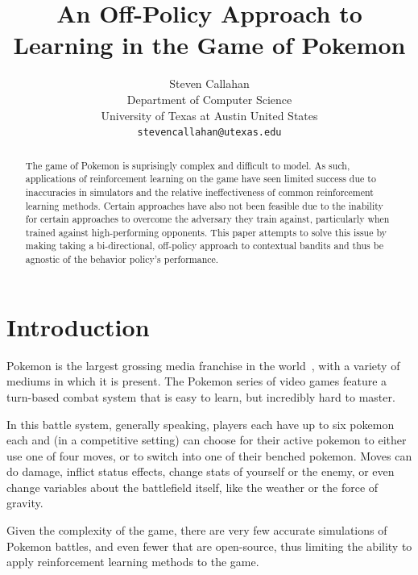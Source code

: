 \documentclass{article}
\title{An Off-Policy Approach to Learning in the Game of Pokemon}
\author{
  Steven Callahan\\
  Department of Computer Science\\
  University of Texas at Austin
  United States\\
  \texttt{stevencallahan@utexas.edu} \\
}
\begin{document}
\maketitle


\begin{abstract}
    The game of Pokemon is suprisingly complex and difficult to model. As such, applications of reinforcement learning on the game have seen limited success due to inaccuracies in simulators and the relative ineffectiveness of common reinforcement learning methods. Certain approaches have also not been feasible due to the inability for certain approaches to overcome the adversary they train against, particularly when trained against high-performing opponents. This paper attempts to solve this issue by making taking a bi-directional, off-policy approach to contextual bandits and thus be agnostic of the behavior policy's performance.
\end{abstract}



\section{Introduction}
	
\quad	Pokemon is the largest grossing media franchise in the world~\citep{Wikipedia}, with a variety of mediums in which it is present. The Pokemon series of video games feature a turn-based combat system that is easy to learn, but incredibly hard to master.

\quad	In this battle system, generally speaking, players each have up to six pokemon each and (in a competitive setting) can choose for their active pokemon to either use one of four moves, or to switch into one of their benched pokemon. Moves can do damage, inflict status effects, change stats of yourself or the enemy, or even change variables about the battlefield itself, like the weather or the force of gravity.

\quad	Given the complexity of the game, there are very few accurate simulations of Pokemon battles, and even fewer that are open-source, thus limiting the ability to apply reinforcement learning methods to the game.
\end{document}
